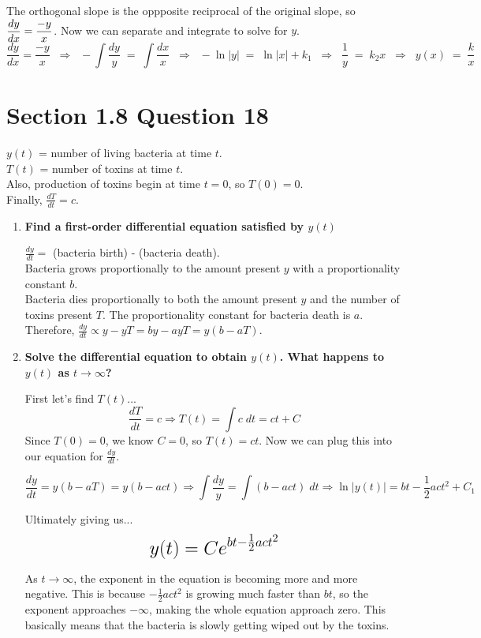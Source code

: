 \documentclass[11pt]{article}
\begin{document}
 The orthogonal slope is the oppposite reciprocal of the original slope, so 
 $\mathlarger{\frac{dy}{dx} = \frac{-y}{x}}$.  Now we can separate and integrate to solve for $y$.
 $$\frac{dy}{dx} = \frac{-y}{x} \;\; \Rightarrow \;\;
 - \int \frac{dy}{y} \; = \; \int \frac{dx}{x} \;\; \Rightarrow \;\;
 - \ln{|y|} \; = \; \ln{|x|} + k_1 \;\; \Rightarrow \;\;
 \frac{1}{y} \; = \; k_2x \;\; \Rightarrow \;\;
 y(x) \; = \; \frac{k}{x}$$

 \section*{Section 1.8 Question 18}
 $y(t)$ = number of living bacteria at time $t$. \\

 $T(t)$ = number of toxins at time $t$. \\
 Also, production of toxins begin at time $t=0$, so $T(0) = 0$. \\

 Finally, $\frac{dT}{dt} = c$.

 \begin{enumerate}[label=(\alph*)]

   \item \textbf{Find a first-order differential equation satisfied by $y(t)$}

     $\frac{dy}{dt} = $ (bacteria birth) - (bacteria death). \\
     Bacteria grows proportionally to the amount present $y$ with a proportionality 
     constant $b$. \\
     Bacteria dies proportionally to both the amount present $y$ and the number of 
     toxins present $T$.  The proportionality constant for bacteria death is $a$. \\
     Therefore, $\frac{dy}{dt} \propto y - yT = by - ayT = y(b - aT)$. \\

   \item \textbf{Solve the differential equation to obtain $y(t)$. What happens to
     $y(t)$ as $t \rightarrow \infty$?}

     First let's find $T(t)$...
     $$\frac{dT}{dt} = c \Rightarrow T(t) = \int c \; dt = ct + C$$
     Since $T(0) = 0$, we know $C = 0$, so $T(t) = ct$.  Now we can plug this into
     our equation for $\frac{dy}{dt}$.

     $$\frac{dy}{dt} = y(b-aT) = y(b-act) \Rightarrow \int \frac{dy}{y}
     = \int (b-act) \; dt \Rightarrow \ln{|y(t)|} = bt - \frac{1}{2}act^2 + C_1$$

     Ultimately giving us... 
     $$\mathlarger{\mathlarger{\mathlarger{y(t) = Ce^{bt - \frac{1}{2}act^2}}}}$$

     As $t \rightarrow \infty$, the exponent in the equation is becoming more and 
     more negative.  This is because $-\frac{1}{2}act^2$ is growing much faster than
     $bt$, so the exponent approaches $-\infty$, making the whole equation approach 
     zero.  This basically means that the bacteria is slowly getting wiped out by the
     toxins.

 \end{enumerate}
\end{document}
